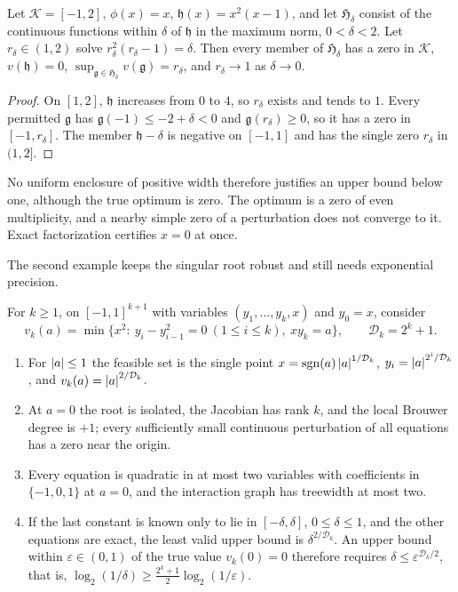 \begin{proposition}
\label{prop:bnd-fixed-gap}
Let $\mathcal K=[-1,2]$, $\phi(x)=x$, $\mathfrak h(x)=x^2(x-1)$, and let
$\mathfrak H_\delta$ consist of the continuous functions within $\delta$ of
$\mathfrak h$ in the maximum norm, $0<\delta<2$. Let $r_\delta\in(1,2)$ solve
$r_\delta^2(r_\delta-1)=\delta$. Then every member of $\mathfrak H_\delta$ has a
zero in $\mathcal K$, $v(\mathfrak h)=0$, $\sup_{\mathfrak g\in\mathfrak
H_\delta}v(\mathfrak g)=r_\delta$, and $r_\delta\to1$ as $\delta\to0$.
\end{proposition}

\begin{proof}
On $[1,2]$, $\mathfrak h$ increases from $0$ to $4$, so $r_\delta$ exists and
tends to $1$. Every permitted $\mathfrak g$ has $\mathfrak g(-1)\le-2+\delta<0$
and $\mathfrak g(r_\delta)\ge0$, so it has a zero in $[-1,r_\delta]$. The
member $\mathfrak h-\delta$ is negative on $[-1,1]$ and has the single zero
$r_\delta$ in $(1,2]$.
\end{proof}

No uniform enclosure of positive width therefore justifies an upper bound
below one, although the true optimum is zero. The optimum is a zero of even
multiplicity, and a nearby simple zero of a perturbation does not converge to
it. Exact factorization certifies $x=0$ at once.

The second example keeps the singular root robust and still needs exponential
precision.

\begin{proposition}
\label{prop:bnd-robust-root}
For $k\ge1$, on $[-1,1]^{k+1}$ with variables $(y_1,\ldots,y_k,x)$ and
$y_0=x$, consider
\[
v_k(a)=\min\{x^2:\ y_i-y_{i-1}^2=0\ (1\le i\le k),\ xy_k=a\},\qquad
\mathcal D_k=2^k+1 .
\]
\begin{enumerate}[label=(\alph*),leftmargin=*]
\item For $\left\lvert a\right\rvert\le1$ the feasible set is the single point
$x=\operatorname{sgn}(a)\left\lvert a\right\rvert^{1/\mathcal D_k}$,
$y_i=\left\lvert a\right\rvert^{2^i/\mathcal D_k}$, and $v_k(a)=\left\lvert a\right\rvert^{2/\mathcal D_k}$.
\item At $a=0$ the root is isolated, the Jacobian has rank $k$, and the local
Brouwer degree is $+1$; every sufficiently small continuous perturbation of
all equations has a zero near the origin.
\item Every equation is quadratic in at most two variables with coefficients
in $\{-1,0,1\}$ at $a=0$, and the interaction graph has treewidth at most two.
\item If the last constant is known only to lie in $[-\delta,\delta]$,
$0\le\delta\le1$, and the other equations are exact, the least valid upper
bound is $\delta^{2/\mathcal D_k}$. An upper bound within $\varepsilon\in(0,1)$ of
the true value $v_k(0)=0$ therefore requires $\delta\le
\varepsilon^{\mathcal D_k/2}$, that is, $\log_2(1/\delta)\ge\tfrac{2^k+1}2
\log_2(1/\varepsilon)$.
\end{enumerate}
\end{proposition}

